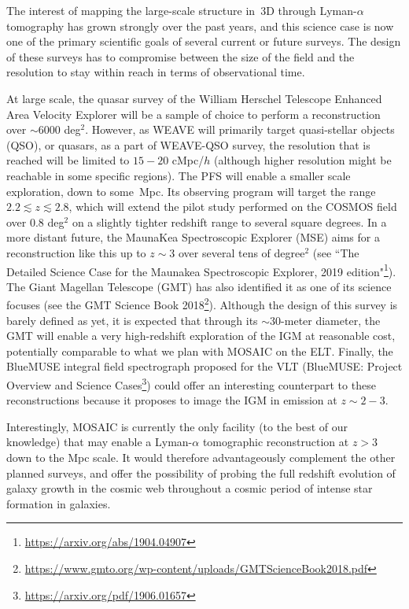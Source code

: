 \documentclass{aa}
\begin{document}
The interest of mapping the large-scale structure in~3D through Lyman-$\alpha$ tomography has grown strongly over the past years, and this science case is now one of the primary scientific goals of several current or future surveys. The design of these surveys has to compromise between the size of the field and the resolution to stay within reach in terms of observational time. 

At large scale, the quasar survey of the William Herschel Telescope Enhanced Area Velocity Explorer \citep[WEAVE; Jin et al. in prep,][]{Pieri2016} will be a sample of choice to perform a reconstruction over $\sim 6000$ deg$^{2}$. However, as WEAVE will primarily target quasi-stellar objects (QSO), or quasars, as a part of WEAVE-QSO survey, the resolution that is reached will be limited to $15-20$ cMpc/$h$ (although higher resolution might be reachable in some specific regions). 
The PFS \citep{Takada2014} will enable a smaller scale exploration, down to some~Mpc.  Its observing program will target the range $2.2\lesssim z \lesssim 2.8$, which will extend the pilot study performed on the COSMOS field over 0.8 deg$^{2}$ on a slightly tighter redshift range \citep[CLAMATO,][]{Lee2018} to several square degrees. In a more distant future, the MaunaKea Spectroscopic Explorer (MSE) aims for a reconstruction like this up to $z\sim 3$ over several tens of degree$^{2}$ (see ``The Detailed Science Case for the Maunakea Spectroscopic Explorer, 2019 edition"\footnote{\url{https://arxiv.org/abs/1904.04907}}). The Giant Magellan Telescope (GMT) has also identified it as one of its science focuses (see the GMT Science Book 2018\footnote{\url{https://www.gmto.org/wp-content/uploads/GMTScienceBook2018.pdf}}). Although the design of this survey is barely defined as yet, it is expected that through its $\sim$30-meter diameter, the GMT will enable a very high-redshift exploration of the IGM at reasonable cost, potentially comparable to what we plan with MOSAIC on the ELT. Finally, the BlueMUSE integral field spectrograph proposed for the VLT (BlueMUSE: Project Overview and Science Cases\footnote{\url{https://arxiv.org/pdf/1906.01657}}) could offer an interesting counterpart to these reconstructions because it proposes to image the IGM\textup{ in emission} at $z\sim 2-3$.

Interestingly, MOSAIC is currently the only facility (to the best of our knowledge) that may enable a Lyman-$\alpha$ tomographic reconstruction at $z>3$ down to the Mpc scale. It would therefore advantageously complement the other planned surveys, and offer the possibility of probing the full redshift evolution of galaxy growth in the cosmic web throughout a cosmic period of intense star formation in galaxies.
\end{document}
